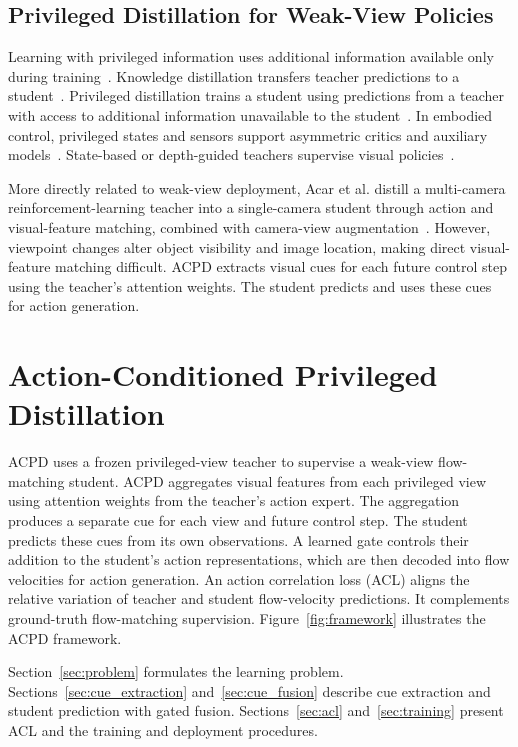 \documentclass{ELSP}
\begin{document}
\subsection{Privileged Distillation for Weak-View Policies}

Learning with privileged information uses additional information available only during training~\cite{JMLR:v16:vapnik15b}. Knowledge distillation transfers teacher predictions to a student~\cite{hinton2015distilling}. Privileged distillation trains a student using predictions from a teacher with access to additional information unavailable to the student~\cite{lopez-paz-2016}. In embodied control, privileged states and sensors support asymmetric critics and auxiliary models~\cite{Pinto-RSS-18,ICLR2024_0b334c64}. State-based or depth-guided teachers supervise visual policies~\cite{NEURIPS2024_215aeb07,NEURIPS2025_07bdb30a}.

More directly related to weak-view deployment, Acar et al. distill a multi-camera reinforcement-learning teacher into a single-camera student through action and visual-feature matching, combined with camera-view augmentation~\cite{10327777}. However, viewpoint changes alter object visibility and image location, making direct visual-feature matching difficult. ACPD extracts visual cues for each future control step using the teacher's attention weights. The student predicts and uses these cues for action generation.

\section{Action-Conditioned Privileged Distillation}

ACPD uses a frozen privileged-view teacher to supervise a weak-view flow-matching student. ACPD aggregates visual features from each privileged view using attention weights from the teacher's action expert. The aggregation produces a separate cue for each view and future control step. The student predicts these cues from its own observations. A learned gate controls their addition to the student's action representations, which are then decoded into flow velocities for action generation. An action correlation loss (ACL) aligns the relative variation of teacher and student flow-velocity predictions. It complements ground-truth flow-matching supervision. Figure~\ref{fig:framework} illustrates the ACPD framework.

Section~\ref{sec:problem} formulates the learning problem. Sections~\ref{sec:cue_extraction} and~\ref{sec:cue_fusion} describe cue extraction and student prediction with gated fusion. Sections~\ref{sec:acl} and~\ref{sec:training} present ACL and the training and deployment procedures.
\end{document}
